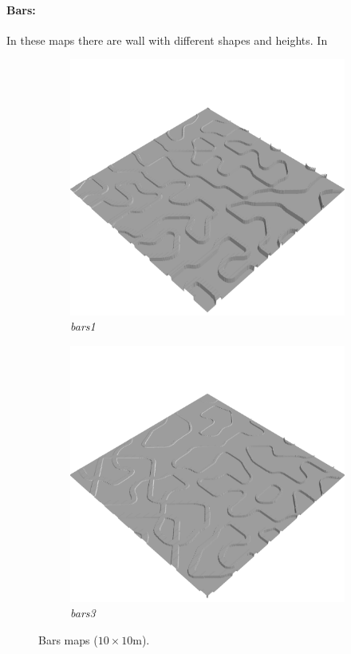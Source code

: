 \documentclass[../document.tex]{subfiles}
\begin{document}
\paragraph{Bars:} In these maps there are wall with different shapes and heights. In 
\begin{figure}[H]
    \centering
        \begin{subfigure}[b]{0.32\textwidth}
            \includegraphics[width=\textwidth]{../img/hm3d/bars1.png}
            \caption{\emph{bars1}}
        \end{subfigure}
        \begin{subfigure}[b]{0.32 \linewidth}
            \includegraphics[width=\textwidth]{../img/hm3d/bars3.png}
            \caption{\emph{bars3}}
            \end{subfigure}     
    \caption{Bars maps ($10\times10$m).}
\end{figure}
\end{document}

